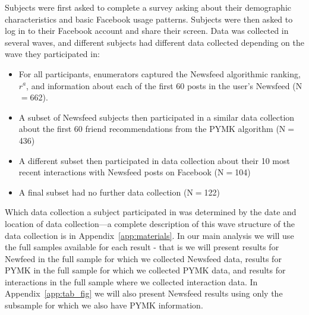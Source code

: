 \documentclass[12pt,letterpaper]{article}
\newcommand{\FullNFUSSurveySampleSize}{662}
\newcommand{\PYMKUSSurveySampleSize}{436}
\newcommand{\RecentInteractionsSampleSize}{104}
\newcommand{\NoFurtherSampleSize}{122}
\begin{document}
Subjects were first asked to complete a survey asking about their demographic characteristics and basic Facebook usage patterns. Subjects were then asked to log in to their Facebook account and share their screen. Data was collected in several waves, and different subjects had different data collected depending on the wave they participated in:
\begin{itemize}
    \item For all participants, enumerators captured the Newsfeed algorithmic ranking, $r^a$, and information about each of the first 60 posts in the user's Newsfeed (N$=$\FullNFUSSurveySampleSize{}).
    \item A subset of Newsfeed subjects then participated in a similar data collection about the first 60 friend recommendations from the PYMK algorithm (N$=$\PYMKUSSurveySampleSize{})
    \item A different subset then participated in data collection about their 10 most recent interactions with Newsfeed posts on Facebook (N$=$\RecentInteractionsSampleSize{})
    \item A final subset had no further data collection (N$=$\NoFurtherSampleSize{})
\end{itemize}
Which data collection a subject participated in was determined by the date and location of data collection---a complete description of this wave structure of the data collection is in Appendix~\ref{app:materials}. In our main analysis we will use the full samples available for each result - that is we will present results for Newfeed in the full sample for which we collected Newsfeed data, results for PYMK in the full sample for which we collected PYMK data, and results for interactions in the full sample where we collected interaction data. In Appendix~\ref{app:tab_fig} we will also present Newsfeed results using only the subsample for which we also have PYMK information.
\end{document}
